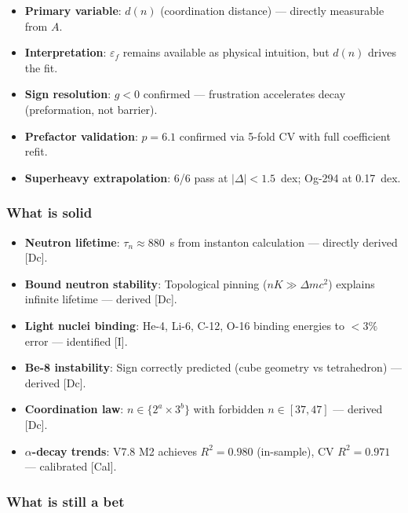\begin{tcolorbox}[colback=green!5!white, colframe=green!75!black, title=What V7.8 M2 adds over earlier versions]
\begin{itemize}
    \item \textbf{Primary variable}: $d(n)$ (coordination distance) --- directly measurable from $A$.
    \item \textbf{Interpretation}: $\varepsilon_f$ remains available as physical intuition, but $d(n)$ drives the fit.
    \item \textbf{Sign resolution}: $g < 0$ confirmed --- frustration accelerates decay (preformation, not barrier).
    \item \textbf{Prefactor validation}: $p = 6.1$ confirmed via 5-fold CV with full coefficient refit.
    \item \textbf{Superheavy extrapolation}: 6/6 pass at $|\Delta| < 1.5$~dex; Og-294 at 0.17~dex.
\end{itemize}
\end{tcolorbox}

\subsubsection{What is solid}

\begin{itemize}
    \item \textbf{Neutron lifetime}: $\tau_n \approx 880$~s from instanton calculation --- directly derived [Dc].
    \item \textbf{Bound neutron stability}: Topological pinning ($nK \gg \Delta m c^2$) explains infinite lifetime --- derived [Dc].
    \item \textbf{Light nuclei binding}: He-4, Li-6, C-12, O-16 binding energies to $<3\%$ error --- identified [I].
    \item \textbf{Be-8 instability}: Sign correctly predicted (cube geometry vs tetrahedron) --- derived [Dc].
    \item \textbf{Coordination law}: $n \in \{2^a \times 3^b\}$ with forbidden $n \in [37,47]$ --- derived [Dc].
    \item \textbf{$\alpha$-decay trends}: V7.8 M2 achieves $R^2 = 0.980$ (in-sample), CV $R^2 = 0.971$ --- calibrated [Cal].
\end{itemize}

\subsubsection{What is still a bet}

